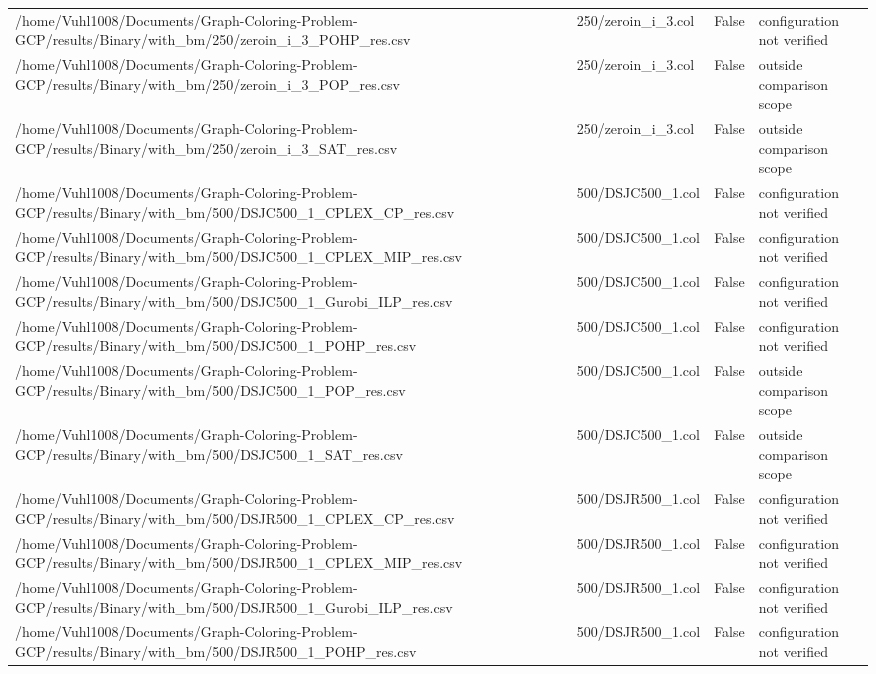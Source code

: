 \begin{table}[htbp]
\begin{tabular}{llll}
/home/Vuhl1008/Documents/Graph-Coloring-Problem-GCP/results/Binary/with\_bm/250/zeroin\_i\_3\_POHP\_res.csv & 250/zeroin\_i\_3.col & False & configuration not verified \\
/home/Vuhl1008/Documents/Graph-Coloring-Problem-GCP/results/Binary/with\_bm/250/zeroin\_i\_3\_POP\_res.csv & 250/zeroin\_i\_3.col & False & outside comparison scope \\
/home/Vuhl1008/Documents/Graph-Coloring-Problem-GCP/results/Binary/with\_bm/250/zeroin\_i\_3\_SAT\_res.csv & 250/zeroin\_i\_3.col & False & outside comparison scope \\
/home/Vuhl1008/Documents/Graph-Coloring-Problem-GCP/results/Binary/with\_bm/500/DSJC500\_1\_CPLEX\_CP\_res.csv & 500/DSJC500\_1.col & False & configuration not verified \\
/home/Vuhl1008/Documents/Graph-Coloring-Problem-GCP/results/Binary/with\_bm/500/DSJC500\_1\_CPLEX\_MIP\_res.csv & 500/DSJC500\_1.col & False & configuration not verified \\
/home/Vuhl1008/Documents/Graph-Coloring-Problem-GCP/results/Binary/with\_bm/500/DSJC500\_1\_Gurobi\_ILP\_res.csv & 500/DSJC500\_1.col & False & configuration not verified \\
/home/Vuhl1008/Documents/Graph-Coloring-Problem-GCP/results/Binary/with\_bm/500/DSJC500\_1\_POHP\_res.csv & 500/DSJC500\_1.col & False & configuration not verified \\
/home/Vuhl1008/Documents/Graph-Coloring-Problem-GCP/results/Binary/with\_bm/500/DSJC500\_1\_POP\_res.csv & 500/DSJC500\_1.col & False & outside comparison scope \\
/home/Vuhl1008/Documents/Graph-Coloring-Problem-GCP/results/Binary/with\_bm/500/DSJC500\_1\_SAT\_res.csv & 500/DSJC500\_1.col & False & outside comparison scope \\
/home/Vuhl1008/Documents/Graph-Coloring-Problem-GCP/results/Binary/with\_bm/500/DSJR500\_1\_CPLEX\_CP\_res.csv & 500/DSJR500\_1.col & False & configuration not verified \\
/home/Vuhl1008/Documents/Graph-Coloring-Problem-GCP/results/Binary/with\_bm/500/DSJR500\_1\_CPLEX\_MIP\_res.csv & 500/DSJR500\_1.col & False & configuration not verified \\
/home/Vuhl1008/Documents/Graph-Coloring-Problem-GCP/results/Binary/with\_bm/500/DSJR500\_1\_Gurobi\_ILP\_res.csv & 500/DSJR500\_1.col & False & configuration not verified \\
/home/Vuhl1008/Documents/Graph-Coloring-Problem-GCP/results/Binary/with\_bm/500/DSJR500\_1\_POHP\_res.csv & 500/DSJR500\_1.col & False & configuration not verified \\

\end{tabular}
\end{table}
